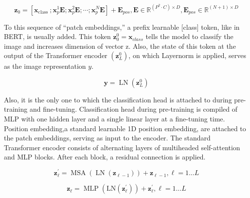 \documentclass[
]{krantz}
\begin{document}
\begin{equation}
\tag{12}
\mathbf{z}_{0} =\left[\mathbf{x}_{\text {class }} ; \mathbf{x}_{p}^{1} \mathbf{E} ; \mathbf{x}_{p}^{2} \mathbf{E} ; \cdots ; \mathbf{x}_{p}^{N} \mathbf{E}\right]+\mathbf{E}_{p o s}, \mathbf{E} \in \mathbb{R}^{\left(P^{2} \cdot C\right) \times D}, \mathbf{E}_{p o s} \in \mathbb{R}^{(N+1) \times D}
\end{equation}

To this sequence of ``patch embeddings,'' a prefix learnable {[}class{]} token, like in BERT, is usually added. This token \(\mathbf{z}_{0}^{0} = \mathbf{x}_{class}\) tells the model to classify the image and increases dimension of vector z. Also, the state of this token at the output of the Transformer encoder \(\left(\mathbf{z}_{L}^{0}\right)\), on which Layernorm is applied, serves as the image representation \(y\).

\begin{equation}
\tag{13}
\mathbf{y} =\operatorname{LN}\left(\mathbf{z}_{L}^{0}\right)
\end{equation}

Also, it is the only one to which the classification head is attached to during pre-training and fine-tuning. Classification head during pre-training is compiled of MLP with one hidden layer and a single linear layer at a fine-tuning time. Position embedding,a standard learnable 1D position embedding, are attached to the patch embeddings, serving as input to the encoder. The standard Transformer encoder consists of alternating layers of multiheaded self-attention and MLP blocks. After each block, a residual connection is applied.

\begin{equation}
\tag{14}
\mathbf{z}_{\ell}^{\prime} =\operatorname{MSA}\left(\operatorname{LN}\left(\mathbf{z}_{\ell-1}\right)\right)+\mathbf{z}_{\ell-1},  \ell=1 \ldots L
\end{equation}

\begin{equation}
\tag{15}
\mathbf{z}_{\ell} =\operatorname{MLP}\left(\mathrm{LN}\left(\mathbf{z}_{\ell}^{\prime}\right)\right)+\mathbf{z}_{\ell}^{\prime}, \ell=1 \ldots L
\end{equation}
\end{document}
